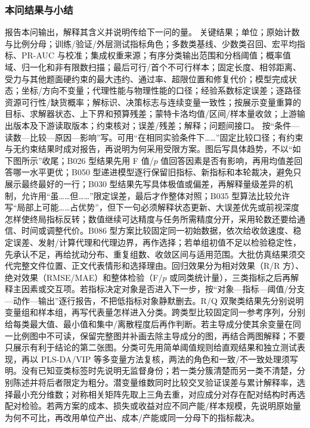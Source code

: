 \documentclass[withoutpreface,bwprint]{cumcmthesis}
\newif\ifmcmguidance
\newcommand{\MCMGuideField}[2]{\par\noindent\textbf{#1：}#2}
\newcommand{\MCMGuide}[7]{%
  \ifmcmguidance
    \begin{mcmguidebox}
      \small\color{black}
      {\color{mcmguidehead}\bfseries 写作指引}
      \MCMGuideField{目标}{#1}
      \MCMGuideField{必备清单}{#2}
      \MCMGuideField{语言风格}{#3}
      \MCMGuideField{篇幅与排版}{#4}
      \MCMGuideField{图表位置}{#5}
      \MCMGuideField{高分点}{#6}
      \MCMGuideField{错误警示}{#7}
    \end{mcmguidebox}
  \fi
}
\begin{document}
\subsubsection{本问结果与小结}
\MCMGuide
  {报告本问输出，解释其含义并说明传给下一问的量。}
  {关键结果；单位；原始计数与比例分母；训练/验证/外层测试指标角色；多数类基线、少数类召回、宏平均指标、PR-AUC 与校准；集成权重来源；有序分类输出范围和分档阈值；概率值域、归一化和非有限数扫描；最后可行/首个不可行样本；固定长度、相邻距离、受力与其他题面硬约束的最大违约、通过率、超限位置和修复代价；模型完成状态；坐标/方向不变量；代理性能与物理性能的口径；经验系数标定误差；逐路径资源可行性/缺货概率；解标识、决策标志与连续变量一致性；按展示变量重算的目标、求解器状态、上下界和预算残差；蒙特卡洛均值/区间/样本量收敛；上游输出版本及下游读取版本；约束核对；误差/残差；解释；问题间接口。}
  {按“条件—读数—比较—原因—影响”写。可用“在相同实验条件下……”固定比较口径；有约束与无约束结果时成对报告，再说明为何采用受限方案。图后写具体趋势，不以“如下图所示”收尾；B026 型结果先用 F 值/$p$ 值回答因素是否有影响，再用均值差回答哪一水平更优；B050 型递进模型逐行保留旧指标、新指标和本轮裁决，避免只展示最终最好的一行；B030 型结果先写具体极值或偏差，再解释量级差异的机制，允许用“虽……但……”限定误差，最后才作整体对照；B035 型算法比较允许写“局部上可能……占优势”，但下一句必须解释状态更新、大误差优先或前视深度怎样使终局指标反转；数值继续可达精度与任务所需精度分开，采用轮数还要给通信、时间或调整代价。B086 型方案比较固定同一初始数据，依次给收敛速度、稳定误差、发射/计算代理和代理边界，再作选择；若单组初值不足以检验稳定性，先承认不足，再给扰动分布、重复组数、收敛区间与适用范围。大批仿真结果须交代完整文件位置、正文代表情形和选择理由。回归效果分为相对效果（R/R 方）、绝对效果（RMSE/MAE）和整体检验（F/$p$ 或同类统计量），三类指标之后再解释主因素或交互项。若指标决定对象是否进入下一步，按“对象—指标—阈值/分支—动作—输出”逐行报告，不把低指标对象静默删去。R/Q 双聚类结果先分别说明变量组和样本组，再写代表量怎样进入分类。跨类型比较固定同一参考序列，分别给每类最大值、最小值和集中/离散程度后再作判断。若主导成分使其余变量在同一比例图中不可读，保留完整图并补画去除主导成分的图，再结合两图解释；不要只展示有利于结论的第二张图。分类可先用简单阈值规则给直观结果和独立测试表现，再以 PLS-DA/VIP 等多变量方法复核，两法的角色和一致/不一致处理须写明。没有已知亚类标签时先说明无监督身份；若一类分簇清楚而另一类不清楚，分别陈述并将后者限定为粗分。潜变量维数同时比较交叉验证误差与累计解释率，选择最小充分维数；对称相关矩阵先取上三角去重，对应成分对存在配对结构时再选配对检验。若两方案的成本、损失或收益对应不同产能/样本规模，先说明原始量为何不可比，再改用单位产出、成本/产能或同一分母下的指标裁决。}
\end{document}
